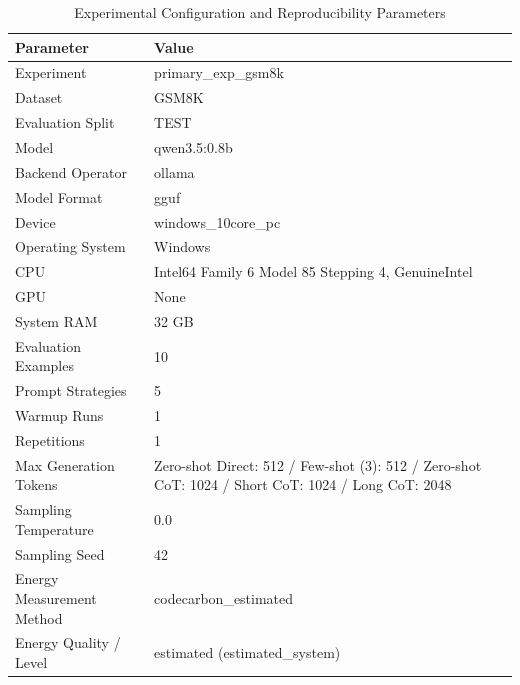 \begin{table}
\caption{Experimental Configuration and Reproducibility Parameters}
\label{tab:experimental_configuration}
\begin{tabular}{ll}
\toprule
Parameter & Value \\
\midrule
Experiment & primary\_exp\_gsm8k \\
Dataset & GSM8K \\
Evaluation Split & TEST \\
Model & qwen3.5:0.8b \\
Backend Operator & ollama \\
Model Format & gguf \\
Device & windows\_10core\_pc \\
Operating System & Windows \\
CPU & Intel64 Family 6 Model 85 Stepping 4, GenuineIntel \\
GPU & None \\
System RAM & 32 GB \\
Evaluation Examples & 10 \\
Prompt Strategies & 5 \\
Warmup Runs & 1 \\
Repetitions & 1 \\
Max Generation Tokens & Zero-shot Direct: 512 / Few-shot (3): 512 / Zero-shot CoT: 1024 / Short CoT: 1024 / Long CoT: 2048 \\
Sampling Temperature & 0.0 \\
Sampling Seed & 42 \\
Energy Measurement Method & codecarbon\_estimated \\
Energy Quality / Level & estimated (estimated\_system) \\
\bottomrule
\end{tabular}
\end{table}
